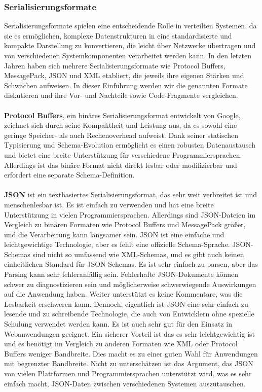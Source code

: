 \documentclass[../vs-script-first-v01.tex]{subfiles}
\begin{document}
\subsubsection{Serialisierungsformate}

Serialisierungsformate spielen eine entscheidende Rolle in verteilten Systemen, da sie es ermöglichen, komplexe Datenstrukturen in eine standardisierte und kompakte Darstellung zu konvertieren, die leicht über Netzwerke übertragen und von verschiedenen Systemkomponenten verarbeitet werden kann. In den letzten Jahren haben sich mehrere Serialisierungsformate wie Protocol Buffers, MessagePack, JSON und XML etabliert, die jeweils ihre eigenen Stärken und Schwächen aufweisen. In dieser Einführung werden wir die genannten Formate diskutieren und ihre Vor- und Nachteile sowie Code-Fragmente vergleichen.
\\\\
\textbf{Protocol Buffers}, ein binäres Serialisierungsformat entwickelt von Google, zeichnet sich durch seine Kompaktheit und Leistung aus, da es sowohl eine geringe Speicher- als auch Rechenoverhead aufweist. Dank seiner statischen Typisierung und Schema-Evolution ermöglicht es einen robusten Datenaustausch und bietet eine breite Unterstützung für verschiedene Programmiersprachen. Allerdings ist das binäre Format nicht direkt lesbar oder modifizierbar und erfordert eine separate Schema-Definition.
\\\\
\textbf{JSON} ist ein textbasiertes Serialisierungsformat, das sehr weit verbreitet ist und menschenlesbar ist. Es ist einfach zu verwenden und hat eine breite Unterstützung in vielen Programmiersprachen. Allerdings sind JSON-Dateien im Vergleich zu binären Formaten wie Protocol Buffers und MessagePack größer, und die Verarbeitung kann langsamer sein.
JSON ist eine einfache und leichtgewichtige Technologie, aber es fehlt eine offizielle Schema-Sprache. JSON-Schemas sind nicht so umfassend wie XML-Schemas, und es gibt auch keinen einheitlichen Standard für JSON-Schemas. Es ist sehr einfach zu parsen, aber das Parsing kann sehr fehleranfällig sein. Fehlerhafte JSON-Dokumente können schwer zu diagnostizieren sein und möglicherweise schwerwiegende Auswirkungen auf die Anwendung haben. Weiter unterstützt es keine Kommentare, was die Lesbarkeit erschweren kann.
Dennoch, eigentlich ist JSON eine sehr einfach zu lesende und zu schreibende Technologie, die auch von Entwicklern ohne spezielle Schulung verwendet werden kann. Es ist auch sehr gut für den Einsatz in Webanwendungen geeignet.
Ein sicherer Vorteil ist das es sehr leichtgewichtig ist und es benötigt im Vergleich zu anderen Formaten wie XML oder Protocol Buffers weniger Bandbreite. Dies macht es zu einer guten Wahl für Anwendungen mit begrenzter Bandbreite.
Nicht zu unterschätzen ist das Argument, das JSON  von vielen Plattformen und Programmiersprachen unterstützt wird, was es sehr einfach macht, JSON-Daten zwischen verschiedenen Systemen auszutauschen.\\\\
\end{document}
